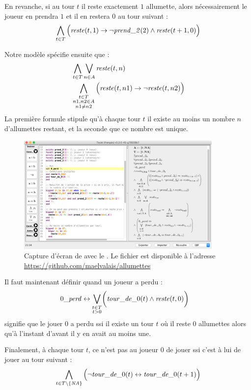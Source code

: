 En revanche, si au tour $t$ il reste exactement $1$ allumette, alors nécessairement le joueur en prendra $1$ et il en restera $0$ au tour suivant :
\begin{gather}
\bigwedge_{t \in T}
    \Big (\mathit{reste}(t, 1) \rightarrow \neg \mathit{prend\_2}(2) \land \mathit{reste}(t+1, 0)\Big )
\end{gather}

Notre modèle spécifie ensuite que :
\begin{align}
& \bigwedge_{t \in T}
    \bigvee_{n \in A}
        \mathit{reste}(t, n) \\
& \bigwedge_{\substack{t \in T\\ n1, n2 \in A\\ n1 \neq n2}}
    \Big ( \mathit{reste}(t, n1) \rightarrow \neg\mathit{reste}(t, n2) \Big )
\end{align}
La première formule stipule qu'à chaque tour $t$ il existe au moins un nombre $n$ d'allumettes restant, et la seconde que ce nombre est unique.

\begin{figure}
\centering
\includegraphics[width=0.9\textwidth]{Pictures/touistScreenshot}
\caption{Capture d'écran de \touist avec le \game. Le fichier est disponible à l'adresse \url{https://github.com/maelvalais/allumettes}}
\label{fig:touistScreenshot}
\end{figure}

Il faut maintenant définir quand un joueur a perdu :
\begin{gather}
\begin{split}
\lost \lequiv \bigvee_{\substack{t \in \turnsSet\\ t > 0}} & \bigg ( \turn{t} \land \rest{t}{0} %
\bigg )
\end{split}
\end{gather}
signifie que le jouer $0$ a perdu ssi il existe un tour $t$ où il reste $0$ allumettes alors qu'à l'instant d'avant il y en avait au moins une.

Finalement, à chaque tour $t$, ce n'est pas au joueur $0$ de jouer ssi c'est à lui de jouer au tour suivant :
\begin{gather}
\bigwedge_{t \in T \setminus \{ \mathit{NA} \} } \Big (
    \neg \mathit{tour\_de\_}0(t) \leftrightarrow \mathit{tour\_de\_}0(t+1)
\Big )
\label{eq:turnChange}
\end{gather}

